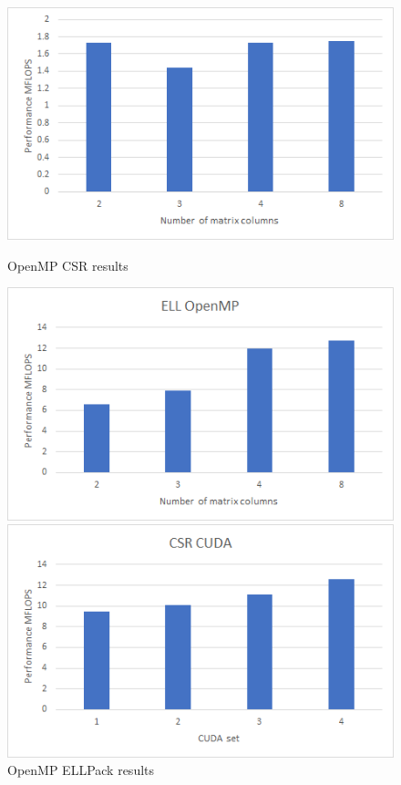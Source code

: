\documentclass{scrreprt}
\begin{document}
\begin{figure}[ht] 
  \label{ fig7} 
  \begin{minipage}[b]{0.5\linewidth}
    \centering
    \includegraphics[width=.9\linewidth]{olm100CSRMP.png} 
    \caption{OpenMP CSR results} 
    \vspace{4ex}
  \end{minipage}%
  \begin{minipage}[b]{0.5\linewidth}
    \centering
    \includegraphics[width=.9\linewidth]{olm100ELLMP.png} 
    \caption{OpenMP ELLPack results} 
    \vspace{4ex}
  \end{minipage} 
  \begin{minipage}[b]{0.5\linewidth}
    \centering
    \includegraphics[width=.9\linewidth]{olm100CSRCUDA.png} 

\end{minipage}
\end{figure}
\end{document}
